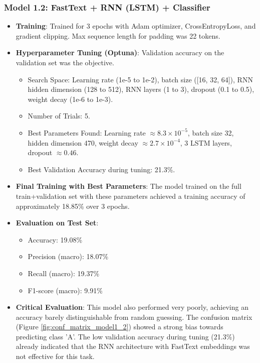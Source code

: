 \documentclass[10.5pt]{article}
\begin{document}
\subsubsection{Model 1.2: FastText + RNN (LSTM) + Classifier}
\begin{itemize}
    \item \textbf{Training}: Trained for 3 epochs with Adam optimizer, CrossEntropyLoss, and gradient clipping. Max sequence length for padding was 22 tokens.
    \item \textbf{Hyperparameter Tuning (Optuna)}: Validation accuracy on the validation set was the objective.
        \begin{itemize}
            \item Search Space: Learning rate (1e-5 to 1e-2), batch size ([16, 32, 64]), RNN hidden dimension (128 to 512), RNN layers (1 to 3), dropout (0.1 to 0.5), weight decay (1e-6 to 1e-3).
            \item Number of Trials: 5.
            \item Best Parameters Found: Learning rate $\approx 8.3 \times 10^{-5}$, batch size 32, hidden dimension 470, weight decay $\approx 2.7 \times 10^{-4}$, 3 LSTM layers, dropout $\approx 0.46$.
            \item Best Validation Accuracy during tuning: 21.3\%.
        \end{itemize}
    \item \textbf{Final Training with Best Parameters}: The model trained on the full train+validation set with these parameters achieved a training accuracy of approximately 18.85\% over 3 epochs.
    \item \textbf{Evaluation on Test Set}:
        \begin{itemize}
            \item Accuracy: 19.08\%
            \item Precision (macro): 18.07\%
            \item Recall (macro): 19.37\%
            \item F1-score (macro): 9.91\%
        \end{itemize}
    \item \textbf{Critical Evaluation}: This model also performed very poorly, achieving an accuracy barely distinguishable from random guessing. The confusion matrix (Figure \ref{fig:conf_matrix_model1_2}) showed a strong bias towards predicting class 'A'. The low validation accuracy during tuning (21.3\%) already indicated that the RNN architecture with FastText embeddings was not effective for this task.
\end{itemize}
\end{document}
